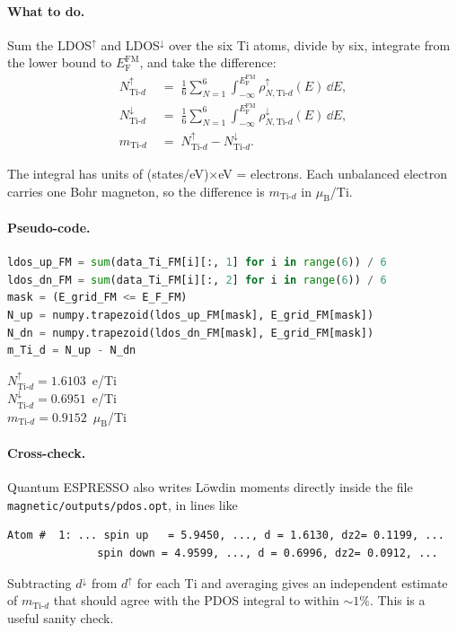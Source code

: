 \documentclass[11pt,a4paper]{article}
\newcommand{\Ef}{E_{\mathrm{F}}}
\newcommand{\Tid}{\text{Ti-}d}
\newcommand{\rhoup}{\rho^{\uparrow}}
\newcommand{\rhodn}{\rho^{\downarrow}}
\begin{document}
\paragraph{What to do.} Sum the LDOS$^{\uparrow}$ and LDOS$^{\downarrow}$
over the six Ti atoms, divide by six, integrate from the lower bound to
$\Ef^{\text{FM}}$, and take the difference:
%
\begin{align}
    N^{\uparrow}_{\Tid}
        &\;=\; \frac{1}{6}\sum_{N=1}^{6}
              \int_{-\infty}^{\Ef^{\text{FM}}}
              \rhoup_{N,\Tid}(E)\,\dd E,
    \label{eq:Nup}\\[4pt]
    N^{\downarrow}_{\Tid}
        &\;=\; \frac{1}{6}\sum_{N=1}^{6}
              \int_{-\infty}^{\Ef^{\text{FM}}}
              \rhodn_{N,\Tid}(E)\,\dd E,
    \label{eq:Ndn}\\[4pt]
    m_{\Tid}
        &\;=\; N^{\uparrow}_{\Tid} - N^{\downarrow}_{\Tid}.
    \label{eq:m}
\end{align}

The integral has units of (states/eV)$\times$eV = electrons. Each
unbalanced electron carries one Bohr magneton, so the difference is
$m_{\Tid}$ in $\mu_{\text{B}}$/Ti.

\paragraph{Pseudo-code.}
\begin{lstlisting}[language=Python]
ldos_up_FM = sum(data_Ti_FM[i][:, 1] for i in range(6)) / 6
ldos_dn_FM = sum(data_Ti_FM[i][:, 2] for i in range(6)) / 6
mask = (E_grid_FM <= E_F_FM)
N_up = numpy.trapezoid(ldos_up_FM[mask], E_grid_FM[mask])
N_dn = numpy.trapezoid(ldos_dn_FM[mask], E_grid_FM[mask])
m_Ti_d = N_up - N_dn
\end{lstlisting}

\begin{resultbox}
$N^{\uparrow}_{\Tid}  = 1.6103$~e/Ti \\
$N^{\downarrow}_{\Tid} = 0.6951$~e/Ti \\
$m_{\Tid} = 0.9152$~$\mu_{\text{B}}$/Ti
\end{resultbox}

\paragraph{Cross-check.} Quantum ESPRESSO also writes Löwdin moments
directly inside the file \texttt{magnetic/outputs/pdos.opt}, in lines
like
\begin{lstlisting}
Atom #  1: ... spin up   = 5.9450, ..., d = 1.6130, dz2= 0.1199, ...
              spin down = 4.9599, ..., d = 0.6996, dz2= 0.0912, ...
\end{lstlisting}
Subtracting $d^{\downarrow}$ from $d^{\uparrow}$ for each Ti and
averaging gives an independent estimate of $m_{\Tid}$ that should agree
with the PDOS integral to within $\sim 1\%$. This is a useful sanity
check.
\end{document}

